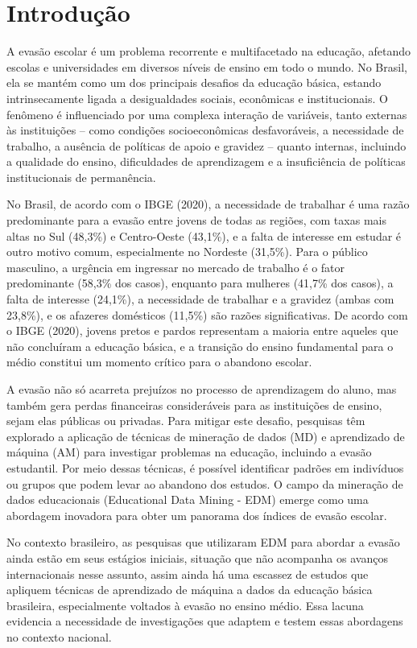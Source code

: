 \documentclass[english, spanish, brazilian]{RBIEarticle} %
\begin{document}
\section{Introdução}
A evasão escolar é um problema recorrente e multifacetado na educação, afetando escolas e universidades em diversos níveis de ensino em todo o mundo. No Brasil, ela se mantém como um dos principais desafios da educação básica, estando intrinsecamente ligada a desigualdades sociais, econômicas e institucionais. O fenômeno é influenciado por uma complexa interação de variáveis, tanto externas às instituições – como condições socioeconômicas desfavoráveis, a necessidade de trabalho, a ausência de políticas de apoio e gravidez – quanto internas, incluindo a qualidade do ensino, dificuldades de aprendizagem e a insuficiência de políticas institucionais de permanência.

No Brasil, de acordo com o IBGE (2020), a necessidade de trabalhar é uma razão predominante para a evasão entre jovens de todas as regiões, com taxas mais altas no Sul (48,3\%) e Centro-Oeste (43,1\%), e a falta de interesse em estudar é outro motivo comum, especialmente no Nordeste (31,5\%). Para o público masculino, a urgência em ingressar no mercado de trabalho é o fator predominante (58,3\% dos casos), enquanto para mulheres (41,7\% dos casos), a falta de interesse (24,1\%), a necessidade de trabalhar e a gravidez (ambas com 23,8\%), e os afazeres domésticos (11,5\%) são razões significativas. De acordo com o IBGE (2020), jovens pretos e pardos representam a maioria entre aqueles que não concluíram a educação básica, e a transição do ensino fundamental para o médio constitui um momento crítico para o abandono escolar.

A evasão não só acarreta prejuízos no processo de aprendizagem do aluno, mas também gera perdas financeiras consideráveis para as instituições de ensino, sejam elas públicas ou privadas. Para mitigar este desafio, pesquisas têm explorado a aplicação de técnicas de mineração de dados (MD) e aprendizado de máquina (AM) para investigar problemas na educação, incluindo a evasão estudantil. Por meio dessas técnicas, é possível identificar padrões em indivíduos ou grupos que podem levar ao abandono dos estudos. O campo da mineração de dados educacionais (Educational Data Mining - EDM) emerge como uma abordagem inovadora para obter um panorama dos índices de evasão escolar.

No contexto brasileiro, as pesquisas que utilizaram EDM para abordar a evasão ainda estão em seus estágios iniciais, situação que não acompanha os avanços internacionais nesse assunto, assim ainda há uma escassez de estudos que apliquem técnicas de aprendizado de máquina a dados da educação básica brasileira, especialmente voltados à evasão no ensino médio. Essa lacuna evidencia a necessidade de investigações que adaptem e testem essas abordagens no contexto nacional.
\end{document}
